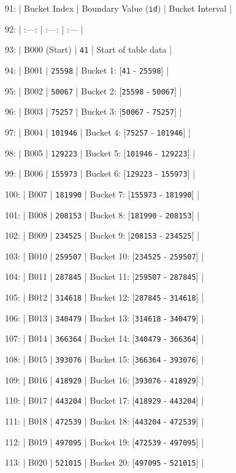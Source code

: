 \documentclass[11pt,a4paper]{article}
\begin{document}
{{{91: | Bucket Index | Boundary Value (\texttt{id}) | Bucket Interval |

92: | :---: | :---: | :--- |

93: | B000 (Start) | \texttt{41} | Start of table data |

94: | B001 | \texttt{25598} | Bucket 1: [\texttt{41} - \texttt{25598}] |

95: | B002 | \texttt{50067} | Bucket 2: [\texttt{25598} - \texttt{50067}] |

96: | B003 | \texttt{75257} | Bucket 3: [\texttt{50067} - \texttt{75257}] |

97: | B004 | \texttt{101946} | Bucket 4: [\texttt{75257} - \texttt{101946}] |

98: | B005 | \texttt{129223} | Bucket 5: [\texttt{101946} - \texttt{129223}] |

99: | B006 | \texttt{155973} | Bucket 6: [\texttt{129223} - \texttt{155973}] |

100: | B007 | \texttt{181990} | Bucket 7: [\texttt{155973} - \texttt{181990}] |

101: | B008 | \texttt{208153} | Bucket 8: [\texttt{181990} - \texttt{208153}] |

102: | B009 | \texttt{234525} | Bucket 9: [\texttt{208153} - \texttt{234525}] |

103: | B010 | \texttt{259507} | Bucket 10: [\texttt{234525} - \texttt{259507}] |

104: | B011 | \texttt{287845} | Bucket 11: [\texttt{259507} - \texttt{287845}] |

105: | B012 | \texttt{314618} | Bucket 12: [\texttt{287845} - \texttt{314618}] |

106: | B013 | \texttt{340479} | Bucket 13: [\texttt{314618} - \texttt{340479}] |

107: | B014 | \texttt{366364} | Bucket 14: [\texttt{340479} - \texttt{366364}] |

108: | B015 | \texttt{393076} | Bucket 15: [\texttt{366364} - \texttt{393076}] |

109: | B016 | \texttt{418929} | Bucket 16: [\texttt{393076} - \texttt{418929}] |

110: | B017 | \texttt{443204} | Bucket 17: [\texttt{418929} - \texttt{443204}] |

111: | B018 | \texttt{472539} | Bucket 18: [\texttt{443204} - \texttt{472539}] |

112: | B019 | \texttt{497095} | Bucket 19: [\texttt{472539} - \texttt{497095}] |

113: | B020 | \texttt{521015} | Bucket 20: [\texttt{497095} - \texttt{521015}] |

}}}
\end{document}
